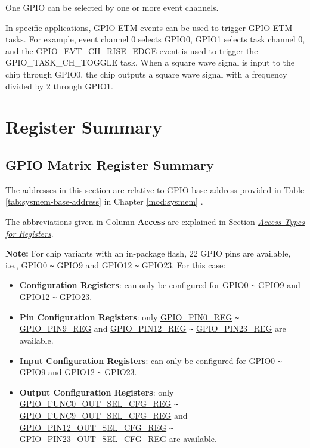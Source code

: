 \documentclass[main\_\_EN.tex]{subfiles}
\begin{document}
\begin{tiplisting}
One GPIO can be selected by one or more event channels.
\end{tiplisting}

In specific applications, GPIO ETM events can be used to trigger GPIO ETM tasks. For example, event channel 0 selects GPIO0, GPIO1 selects task channel 0, and the GPIO\_EVT\_CH\_RISE\_EDGE event is used to trigger the GPIO\_TASK\_CH\_TOGGLE task. When a square wave signal is input to the chip through GPIO0, the chip outputs a square wave signal with a frequency divided by 2 through GPIO1.
















\hypertarget{iomuxgpio-reg-summ}{}
\section{Register Summary}
\subsection{GPIO Matrix Register Summary}
The addresses in this section are relative to GPIO base address provided in Table \ref{tab:sysmem-base-address} in Chapter \ref{mod:sysmem} \textit{}.

The abbreviations given in Column \textbf{Access} are explained in Section \hyperref[glossary-access-types]{\textit{Access Types for Registers}}.

\textbf{Note:} For chip variants with an in-package flash, 22 GPIO pins are available, i.e., GPIO0 \verb+~+ GPIO9 and GPIO12 \verb+~+ GPIO23. For this case:
\begin{itemize}
    \item \textbf{Configuration Registers}: can only be configured for GPIO0 \verb+~+ GPIO9 and GPIO12 \verb+~+ GPIO23.
    \item \textbf{Pin Configuration Registers}: only \hyperref[regdesc:GPIOPINNREG]{GPIO\_PIN0\_REG} \verb+~+ \hyperref[regdesc:GPIOPINNREG]{GPIO\_PIN9\_REG} and \hyperref[regdesc:GPIOPINNREG]{GPIO\_PIN12\_REG} \verb+~+ \hyperref[regdesc:GPIOPINNREG]{GPIO\_PIN23\_REG} are available.
    \item \textbf{Input Configuration Registers}: can only be configured for GPIO0 \verb+~+ GPIO9 and GPIO12 \verb+~+ GPIO23.
    \item \textbf{Output Configuration Registers}: only \hyperref[regdesc:GPIOFUNCNOUTSELCFGREG]{GPIO\_FUNC0\_OUT\_SEL\_CFG\_REG} \verb+~+ \hyperref[regdesc:GPIOFUNCNOUTSELCFGREG]{GPIO\_FUNC9\_OUT\_SEL\_CFG\_REG} and \hyperref[regdesc:GPIOFUNCNOUTSELCFGREG]{GPIO\_PIN12\_OUT\_SEL\_CFG\_REG} \verb+~+ \hyperref[regdesc:GPIOFUNCNOUTSELCFGREG]{GPIO\_PIN23\_OUT\_SEL\_CFG\_REG} are available.
\end{itemize}
\end{document}
